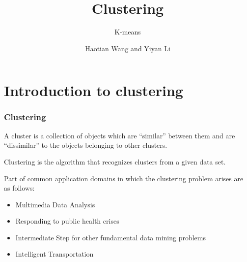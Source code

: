 \documentclass[9pt]{beamer}
\begin{document}

\title{Clustering}
\subtitle{K-means}
\author{Haotian Wang and Yiyan Li}
\date{\hspace{2em}}
\frame{
	\titlepage
}
\section{Introduction to clustering}
\begin{frame}
	\frametitle{Clustering}
	\begin{definition}
		A cluster is a collection of objects which are “similar” between them and are “dissimilar” to the objects belonging to other clusters.
	\end{definition}
	\begin{definition}
		Clustering is the algorithm that recognizes clusters from a given data set.
	\end{definition}
	\pause
	Part of common application domains in which the clustering problem arises are as follows:
	\begin{itemize}
		\item Multimedia Data Analysis
		\item Responding to public health crises
		\item Intermediate Step for other fundamental data mining problems
		\item Intelligent Transportation
	\end{itemize}
\end{frame}

\end{document}
